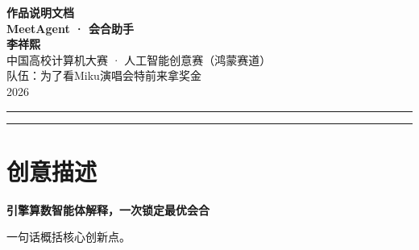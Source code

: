 \documentclass[UTF8,a4paper,zihao=-4]{ctexart}
\newcommand{\WorkTitle}{MeetAgent · 会合助手}
\newcommand{\TeamName}{为了看Miku演唱会特前来拿奖金}
\newcommand{\AuthorNames}{李祥熙}
\newcommand{\ContestTrack}{人工智能创意赛（鸿蒙赛道）}
\newcommand{\Slogan}{引擎算数智能体解释，一次锁定最优会合}
\begin{document}
\pagestyle{empty}

\begin{center}
  {\bfseries 作品说明文档}\\[1.2em]
  {\bfseries \WorkTitle}\\[0.8em]
  {\bfseries \AuthorNames}\\[1.6em]
  { 中国高校计算机大赛 · \ContestTrack}\\[0.4em]
  { 队伍：\TeamName}\\[0.4em]
  { 2026}
\end{center}

\vspace{1.0em}
\noindent\rule{\textwidth}{0.6pt}

\begin{abstract}
\noindent
{
\textbf{摘要：}
MeetAgent（会合助手）是一款 HarmonyOS 智能会合规划应用，面向网约车接人、亲友接送、校园/园区接驳等高频场景。
针对“固定上车点 + 单侧导航”导致的双方空等与绕路，应用将\textbf{确定性路线拦截引擎}与\textbf{工具调用型 LLM Agent}结合：
由高德实时/估算路径与本地评分生成步行、骑行、公交与原地等待等候选；
智能体理解自然语言约束并解释取舍，\textbf{所有 ETA、距离与折线均来自工具与引擎}。
用户确认后锁定方案，支持分享与打开地图；无大模型密钥时仍可离线规划，保证演示与实战可用性。
}
\end{abstract}

\noindent\rule{\textwidth}{0.6pt}
\tableofcontents
\newpage
\pagestyle{fancy}
\setcounter{page}{1}

\section{创意描述}

\begin{center}
  {\bfseries \Slogan}
\end{center}

\vspace{0.35em}
{\songti
一句话概括核心创新点。
}

\vspace{0.5em}
\end{document}
